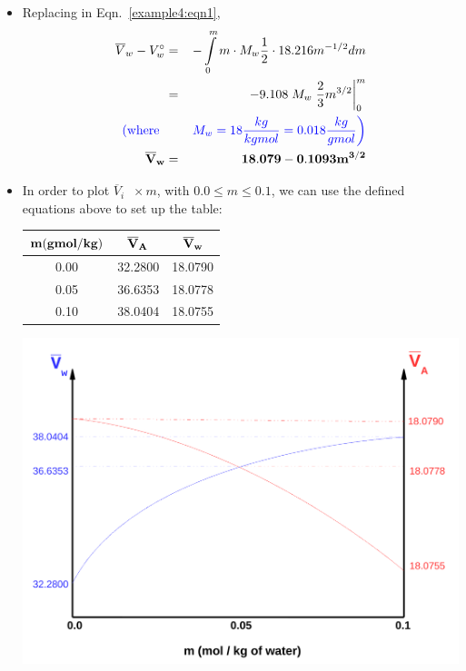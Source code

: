 \documentclass[12pts,a4paper,amsmath,amssymb,floatfix]{article}%
\renewcommand\leq{\leqslant}
\newcommand{\frc}{\displaystyle\frac}
\newcommand{\blue}{\textcolor{blue}}
\begin{document}
\begin{enumerate}[label=\bfseries Example \arabic*]
\begin{itemize}
  \item Replacing in Eqn.~\ref{example4:eqn1}, 
      \begin{eqnarray}
         \overline{V}_{w} - V_{w}^{\circ} &=& -\int\limits_{0}^{m} m\cdot M_{w} \frc{1}{2}\cdot 18.216 m^{-1/2} dm \nonumber \\
                                       &=& -9.108\; M_{w} \left. \frc{2}{3} m^{3/2}\right|_{0}^{m} \nonumber \\
         \blue{\left(\text{where }\right.}&& \blue{\left. M_{w} = 18 \frc{kg}{kgmol} = 0.018 \frc{kg}{gmol}\right)} \nonumber \\
         {\bf \overline{V}_{w}} &=& {\bf 18.079 - 0.1093 m^{3/2}} \nonumber 
      \end{eqnarray}

  \item In order to plot $\overline{V}_{i}\;\;\times m$, with $0.0\leq m\leq 0.1$, we can use the defined equations above to set  up the table:
        \begin{center}
          \begin{tabular}{|c | c c |}
            \hline
            ${\bf m (gmol/kg)}$ & ${\bf \overline{V}_{A}}$ & ${\bf \overline{V}_{w}}$ \\
            \hline
              0.00  & 32.2800 &  18.0790 \\
              0.05  & 36.6353 &  18.0778 \\
              0.10  & 38.0404 &  18.0755 \\
             \hline
          \end{tabular}
        \end{center}
          \begin{center}
              \includegraphics[width=0.75\columnwidth,clip]{./../Pics/Example04_Pic}
          \end{center}


\end{itemize}

\end{enumerate} 

%
\end{document}
